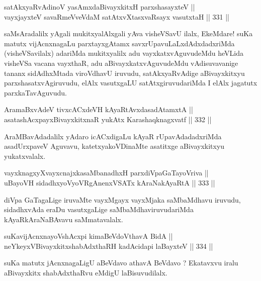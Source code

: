 \begin{shl}
satAkxyaRvAdinoV yasAmxdaBivayxkitxH parxshasayxteV ||  \\
vayxjayxteV savaRmeVveVdaM satAtxvXtasxvaRsayx vasutxtaH \hfill || 331 ||  
\end{shl}

\begin{artha}
saMsAradalilx yAgali mukitxyalAlxgali yAva visheVSavU ilalx, EkeMdare!
suKa matutx vijAcnxnagaLu parxtayxgAtamx savxrUpavuLaLxdAdxdadxriMda
(visheVSavilalx) adariMda mukitxyalilx adu vayxkatxvAguvudeMdu heVLida
visheVSa vacana vayxthaR, adu aBivayxkatxvAguvudeMdu vAdisuvavanige
tananx sidAdhxMtada viroVdhavU iruvudu, satAkxyaRvAdige aBivayxkitxyu
parxshasatxvAgiruvudu, elAlx vasutxgaLU satAtxgiruvudariMda I elAlx
jagatutx parxkaTavAguvudu.
\end{artha}

\begin{shl}
AramaBxvAdeV tivxcACxdeVH kAyaRtAvxdasadAtamxtA || \\
asatashAcxpayxBivayxkitxnaR yukAtx Karashaqknagxvatf \hfill || 332 ||  
\end{shl}

\begin{artha}
AraMBavAdadalilx yAdaro icACxdigaLu kAyaR rUpavAdadadxriMda
asadUrxpaveV Aguvavu, katetxyakoVDinaMte asatitxge aBivayxkitxyu
yukatxvalalx.
\end{artha}

\begin{shl}
vayxknagxyXvayxcnajxkasaMbanadhxH parxdiVpaGaTayoVriva || \\
uBayoVH sidadhxyoVyoVRgAnenxVSATx kAraNakAyaRtA \hfill || 333 ||  
\end{shl}

\begin{artha}
diVpa GaTagaLige iruvaMte vayxMgayx vayxMjaka saMbaMdhavu iruvudu,
sidadhxvAda eraDu vasutxgaLige saMbaMdhaviruvudariMda
kAyaRkAraNaBAvavu saMmatavalalx.
\end{artha}

\begin{shl}
suKavijAcnxnayoVshAcxpi kimaBeVdoV\s thavA BidA || \\
neYkeyxV\s BivayxkitxshabAdxthaRH kadAcidapi laBayxteV \hfill || 334 ||  
\end{shl}

\begin{artha}
suKa matutx jAcnxnagaLigU aBeVdavo athavA BeVdavo ? Ekatavxvu iralu
aBivayxkitx shabAdxthaRvu eMdigU laBisuvudilalx.
\end{artha}

